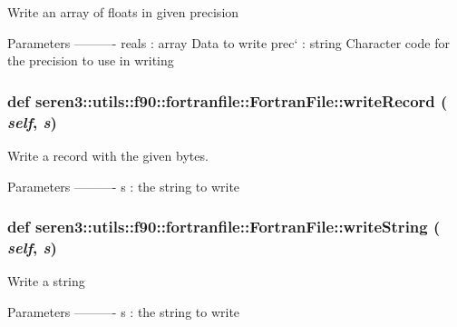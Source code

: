 \label{classseren3_1_1utils_1_1f90_1_1fortranfile_1_1FortranFile_a97118a86f5a056d556e376e349695a59}
\begin{DoxyVerb}Write an array of floats in given precision

Parameters
----------
reals : array
    Data to write
prec` : string
    Character code for the precision to use in writing
\end{DoxyVerb}
 \hypertarget{classseren3_1_1utils_1_1f90_1_1fortranfile_1_1FortranFile_a6b02f2bee97855da0d7d712afe50b96a}{
\subsubsection[{writeRecord}]{\setlength{\rightskip}{0pt plus 5cm}def seren3::utils::f90::fortranfile::FortranFile::writeRecord ( {\em self}, \/   {\em s})}}
\label{classseren3_1_1utils_1_1f90_1_1fortranfile_1_1FortranFile_a6b02f2bee97855da0d7d712afe50b96a}
\begin{DoxyVerb}Write a record with the given bytes.

Parameters
----------
s : the string to write

\end{DoxyVerb}
 \hypertarget{classseren3_1_1utils_1_1f90_1_1fortranfile_1_1FortranFile_a195740ec1124270c43d7e832126fb66c}{
\subsubsection[{writeString}]{\setlength{\rightskip}{0pt plus 5cm}def seren3::utils::f90::fortranfile::FortranFile::writeString ( {\em self}, \/   {\em s})}}
\label{classseren3_1_1utils_1_1f90_1_1fortranfile_1_1FortranFile_a195740ec1124270c43d7e832126fb66c}
\begin{DoxyVerb}Write a string

Parameters
----------
s : the string to write

\end{DoxyVerb}
 

